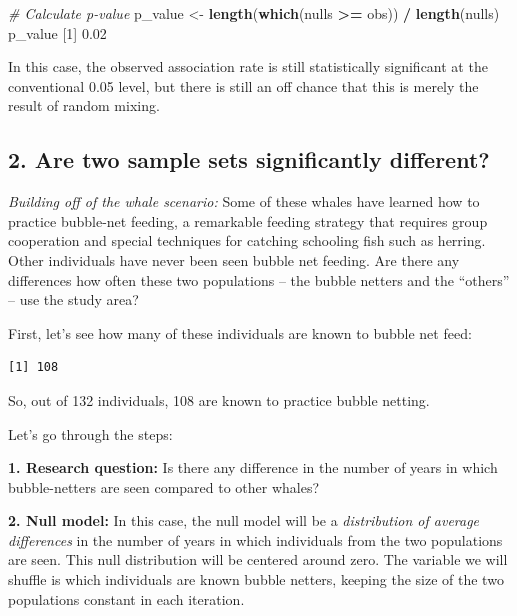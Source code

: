 \documentclass[
]{book}
\newenvironment{Shaded}{\begin{snugshade}}{\end{snugshade}}
\newcommand{\CommentTok}[1]{\textcolor[rgb]{0.56,0.35,0.01}{\textit{#1}}}
\newcommand{\DecValTok}[1]{\textcolor[rgb]{0.00,0.00,0.81}{#1}}
\newcommand{\FloatTok}[1]{\textcolor[rgb]{0.00,0.00,0.81}{#1}}
\newcommand{\KeywordTok}[1]{\textcolor[rgb]{0.13,0.29,0.53}{\textbf{#1}}}
\newcommand{\NormalTok}[1]{#1}
\newcommand{\OperatorTok}[1]{\textcolor[rgb]{0.81,0.36,0.00}{\textbf{#1}}}
\newcommand{\StringTok}[1]{\textcolor[rgb]{0.31,0.60,0.02}{#1}}
\begin{document}
\begin{Shaded}
\begin{Highlighting}[]

\CommentTok{# Calculate p-value}
\NormalTok{p_value <-}\StringTok{ }\KeywordTok{length}\NormalTok{(}\KeywordTok{which}\NormalTok{(nulls }\OperatorTok{>=}\StringTok{ }\NormalTok{obs)) }\OperatorTok{/}\StringTok{ }\KeywordTok{length}\NormalTok{(nulls)}
\NormalTok{p_value}
\NormalTok{[}\DecValTok{1}\NormalTok{] }\FloatTok{0.02}
\end{Highlighting}
\end{Shaded}

In this case, the observed association rate is still statistically significant at the conventional 0.05 level, but there is still an off chance that this is merely the result of random mixing.

\hypertarget{are-two-sample-sets-significantly-different}{%
\subsection*{2. Are two sample sets significantly different?}\label{are-two-sample-sets-significantly-different}}

\emph{Building off of the whale scenario:} Some of these whales have learned how to practice bubble-net feeding, a remarkable feeding strategy that requires group cooperation and special techniques for catching schooling fish such as herring. Other individuals have never been seen bubble net feeding. Are there any differences how often these two populations -- the bubble netters and the ``others'' -- use the study area?

First, let's see how many of these individuals are known to bubble net feed:

\begin{verbatim}
[1] 108
\end{verbatim}

So, out of 132 individuals, 108 are known to practice bubble netting.

Let's go through the steps:

\textbf{1. Research question:} Is there any difference in the number of years in which bubble-netters are seen compared to other whales?

\textbf{2. Null model:} In this case, the null model will be a \emph{distribution of average differences} in the number of years in which individuals from the two populations are seen. This null distribution will be centered around zero. The variable we will shuffle is which individuals are known bubble netters, keeping the size of the two populations constant in each iteration.
\end{document}

